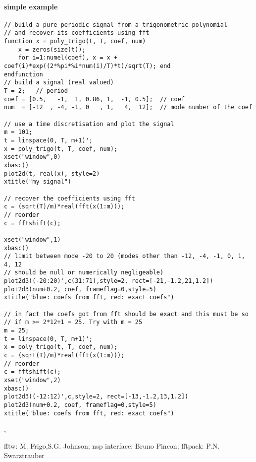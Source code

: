 \begin{examples}
 \paragraph{simple example}
  \begin{Verbatim}
// build a pure periodic signal from a trigonometric polynomial
// and recover its coefficients using fft
function x = poly_trigo(t, T, coef, num)
    x = zeros(size(t));
    for i=1:numel(coef), x = x + coef(i)*exp((2*%pi*%i*num(i)/T)*t)/sqrt(T); end
endfunction
// build a signal (real valued)
T = 2;   // period
coef = [0.5,   -1,  1, 0.86, 1,  -1, 0.5];  // coef
num  = [-12  , -4, -1, 0   , 1,   4,  12];  // mode number of the coef

// use a time discretisation and plot the signal
m = 101;
t = linspace(0, T, m+1)';
x = poly_trigo(t, T, coef, num);
xset("window",0)
xbasc()
plot2d(t, real(x), style=2)
xtitle("my signal")

// recover the coefficients using fft
c = (sqrt(T)/m)*real(fft(x(1:m)));
// reorder
c = fftshift(c);

xset("window",1)
xbasc()
// limit between mode -20 to 20 (modes other than -12, -4, -1, 0, 1, 4, 12
// should be null or numerically negligeable)
plot2d3((-20:20)',c(31:71),style=2, rect=[-21,-1.2,21,1.2])
plot2d3(num+0.2, coef, frameflag=0,style=5)
xtitle("blue: coefs from fft, red: exact coefs")

// in fact the coefs got from fft should be exact and this must be so
// if m >= 2*12+1 = 25. Try with m = 25
m = 25;
t = linspace(0, T, m+1)';
x = poly_trigo(t, T, coef, num);
c = (sqrt(T)/m)*real(fft(x(1:m)));
// reorder
c = fftshift(c);
xset("window",2)
xbasc()
plot2d3((-12:12)',c,style=2, rect=[-13,-1.2,13,1.2])
plot2d3(num+0.2, coef, frameflag=0,style=5)
xtitle("blue: coefs from fft, red: exact coefs")
  \end{Verbatim}
 \end{examples}

\begin{manseealso}
  , 
\end{manseealso}

\begin{authors}
   fftw: M. Frigo,S.G. Johnson;  nsp interface: Bruno Pincon; fftpack: P.N. Swarztrauber
\end{authors}
